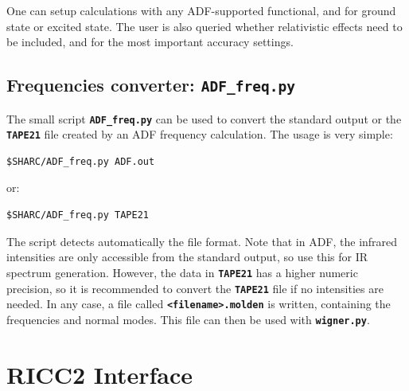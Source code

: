\documentclass[a4paper,10pt,DIV=15,openany]{scrbook}
\newcommand{\ttt}[1]{\textbf{\texttt{#1}}}
\newenvironment{example}{
  \setlength{\OuterFrameSep}{3pt}
  \vspace{0mm}
  \definecolor{shadecolor}{HTML}{E4F4FF}
  \begin{shaded}
}{
  \end{shaded}
}
\begin{document}
One can setup calculations with any ADF-supported functional, and for ground state or excited state. The user is also queried whether relativistic effects need to be included, and for the most important accuracy settings.

% 
% 



\subsection{Frequencies converter: \ttt{ADF\_freq.py}}\label{sec:ADF_freq.py}

The small script \ttt{ADF\_freq.py} can be used to convert the standard output or the \ttt{TAPE21} file created by an ADF frequency calculation.
The usage is very simple:
\begin{example}
  \begin{verbatim}
$SHARC/ADF_freq.py ADF.out
\end{verbatim}
\end{example}
or:
\begin{example}
  \begin{verbatim}
$SHARC/ADF_freq.py TAPE21
\end{verbatim}
\end{example}
The script detects automatically the file format.
Note that in ADF, the infrared intensities are only accessible from the standard output, so use this for IR spectrum generation.
However, the data in \ttt{TAPE21} has a higher numeric precision, so it is recommended to convert the \ttt{TAPE21} file if no intensities are needed.
In any case, a file called \ttt{<filename>.molden} is written, containing the frequencies and normal modes.
This file can then be used with \ttt{wigner.py}.



\section{RICC2 Interface}\label{sec:int:ricc2}
\end{document}
